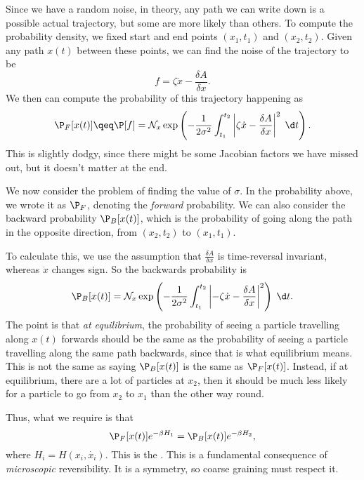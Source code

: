 \documentclass[a4paper]{article}
\begin{document}
Since we have a random noise, in theory, any path we can write down is a possible actual trajectory, but some are more likely than others. To compute the probability density, we fixed start and end points $(x_1, t_1)$ and $(x_2, t_2)$. Given any path $x(t)$ between these points, we can find the noise of the trajectory to be
\[
  f = \zeta \dot{x} - \frac{\delta A}{\delta x}.
\]
We then can compute the probability of this trajectory happening as
\[
  \P_F[x(t)] \qeq \P[f] = \mathcal{N}_x \exp \left( -\frac{1}{2 \sigma^2} \int_{t_1}^{t_2} \left|\zeta \dot{x} - \frac{\delta A}{\delta x}\right|^2\;\d t\right).
\]
This is slightly dodgy, since there might be some Jacobian factors we have missed out, but it doesn't matter at the end.

We now consider the problem of finding the value of $\sigma$. In the probability above, we wrote it as $\P_F$, denoting the \emph{forward} probability. We can also consider the backward probability $\P_B[x(t)]$, which is the probability of going along the path in the opposite direction, from $(x_2, t_2)$ to $(x_1, t_1)$.

To calculate this, we use the assumption that $\frac{\delta A}{\delta x}$ is time-reversal invariant, whereas $\dot{x}$ changes sign. So the backwards probability is
\[
  \P_B[x(t)] = \mathcal{N}_x \exp \left( - \frac{1}{2\sigma^2}\int_{t_1}^{t_2} \left|-\zeta\dot{x} - \frac{\delta A}{\delta x}\right|^2\right)\;\d t.
\]
The point is that \emph{at equilibrium}, the probability of seeing a particle travelling along $x(t)$ forwards should be the same as the probability of seeing a particle travelling along the same path backwards, since that is what equilibrium means. This is not the same as saying $\P_B[x(t)]$ is the same as $\P_F[x(t)]$. Instead, if at equilibrium, there are a lot of particles at $x_2$, then it should be much less likely for a particle to go from $x_2$ to $x_1$ than the other way round.

Thus, what we require is that
\[
  \P_F[x(t)] e^{-\beta H_1} = \P_B[x(t)] e^{-\beta H_2},
\]
where $H_i = H(x_i, \dot{x_i})$. This is the . This is a fundamental consequence of \emph{microscopic} reversibility. It is a symmetry, so coarse graining must respect it.
\end{document}

